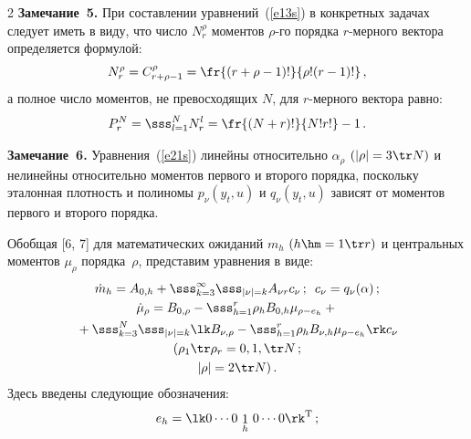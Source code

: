\begin{multicols}{2}
\noindent
\textbf{Замечание~5.} При составлении уравнений~(\ref{e13s}) 
в конкретных задачах следует иметь в виду, что число $N_r^\rho$ 
моментов $\rho$-го порядка $r$-мер\-но\-го вектора определяется формулой:
    $$
    N_r^\rho = C_{r+\rho-1}^\rho = \fr{(r+\rho-1)!}{\rho! (r-1)!}\,,
    $$
а полное число моментов, не превосходящих $N$, для $r$-мер\-но\-го
вектора равно:
    $$
    P_r^N =\sss_{l=1}^N N_r^l = \fr{(N+r)!}{N! r!}-1\,.$$
    
    \medskip

\noindent
\textbf{Замечание~6.} Уравнения~(\ref{e21s}) линейны относительно  
$\alpha_\rho$ $(\left\vert \rho\right\vert = 3\tr N)$ и 
нелинейны относительно моментов первого и второго порядка, поскольку эталонная плот\-ность 
и полиномы  $p_\nu (y_t,u)$ и $q_\nu (y_t,u)$ зависят от моментов первого и второго порядка.

\smallskip

Обобщая [6, 7] для математических ожиданий $m_h$ $(h\hm=1\tr r)$ и центральных 
моментов $\mu_\rho$ порядка~$\rho$, представим уравнения в виде:
\begin{gather}
\dot m_h = A_{0, h} +\sss_{k=3}^\infty \sss_{|\nu |=k} A_{\nu r} c_\nu\,;\enskip 
c_\nu = q_\nu (\alpha)\,;\label{e23s}\\
\dot\mu_\rho = B_{0,\rho} - \sss_{h=1}^r \rho_h B_{0,h} \mu_{\rho- e_h} + {}\notag\\
{}+
\sss_{k=3}^N \sss_{|\nu |=k} \lk B_{\nu,\rho} - 
\sss_{h=1}^r \rho_h B_{\nu,h} \mu_{\rho - e_h}\rk c_\nu\notag \\
(\rho_1\tr \rho_r = 0,1,\tr N\,; \notag\\ 
\left\vert \rho\right\vert = 2\tr N)\,.\label{e24s}
\end{gather}
Здесь введены следующие обозначения:
\begin{equation*}
e_h = \lk 0\cdots 0 \ {\ed\limits_h}\  0\cdots 0\rk^{\mathrm{T}}\,;
\end{equation*}


\end{multicols}

